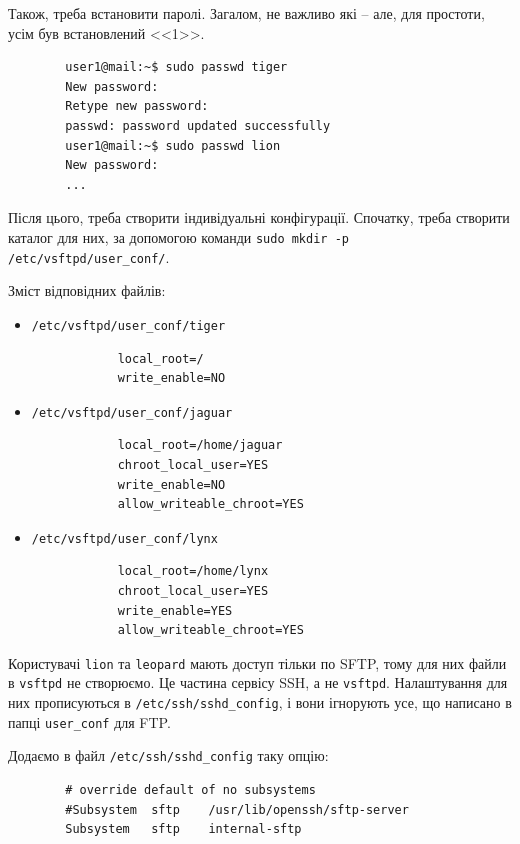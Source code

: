 \documentclass[14pt, a4paper]{extreport}
\begin{document}
	Також, треба встановити паролі. Загалом, не важливо які -- але, для простоти, усім був встановлений <<1>>.
	
	\begin{verbatim}
		user1@mail:~$ sudo passwd tiger
		New password: 
		Retype new password: 
		passwd: password updated successfully
		user1@mail:~$ sudo passwd lion
		New password: 
		...
	\end{verbatim}
	
	Після цього, треба створити індивідуальні конфігурації. Спочатку, треба створити каталог для них, за допомогою команди \texttt{sudo mkdir -p /etc/vsftpd/user\_conf/}.
	
	Зміст відповідних файлів:
	
	\begin{itemize}
		\item \texttt{/etc/vsftpd/user\_conf/tiger}
		
		\begin{verbatim}
			local_root=/
			write_enable=NO
		\end{verbatim}
		
		\item \texttt{/etc/vsftpd/user\_conf/jaguar}
		
		\begin{verbatim}
			local_root=/home/jaguar
			chroot_local_user=YES
			write_enable=NO
			allow_writeable_chroot=YES
		\end{verbatim}
		
		\item \texttt{/etc/vsftpd/user\_conf/lynx}
		
		\begin{verbatim}
			local_root=/home/lynx
			chroot_local_user=YES
			write_enable=YES
			allow_writeable_chroot=YES
		\end{verbatim}
	\end{itemize}
	
	Користувачі \texttt{lion} та \texttt{leopard} мають доступ тільки по SFTP, тому для них файли в \texttt{vsftpd} не створюємо. Це частина сервісу SSH, а не \texttt{vsftpd}. Налаштування для них прописуються в \texttt{/etc/ssh/sshd\_config}, і вони ігнорують усе, що написано в папці \texttt{user\_conf} для FTP.
	
	Додаємо в файл \texttt{/etc/ssh/sshd\_config} таку опцію:
	
	\begin{verbatim}
		# override default of no subsystems
		#Subsystem	sftp	/usr/lib/openssh/sftp-server
		Subsystem	sftp	internal-sftp
	\end{verbatim}
	
\end{document}
